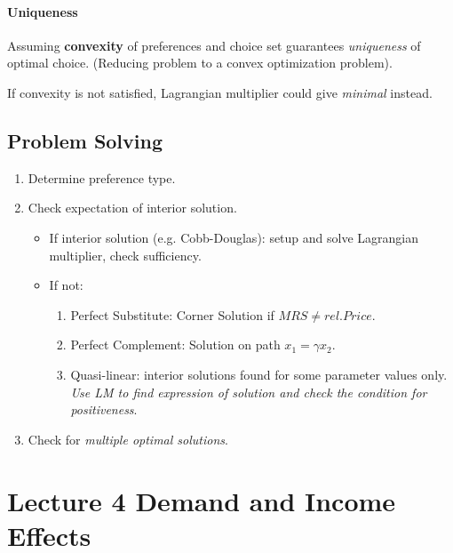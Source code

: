 \documentclass[]{article}
\begin{document}
            \paragraph{Uniqueness} Assuming \textbf{convexity} of preferences and choice set guarantees \emph{uniqueness} of optimal choice. (Reducing problem to a convex optimization problem).
            
            \begin{remark}
                If convexity is not satisfied, Lagrangian multiplier could give \emph{minimal} instead. 
            \end{remark}
        
        \subsection{Problem Solving}
            \begin{enumerate}
                \item Determine preference type.
                \item Check expectation of interior solution.
                \begin{itemize}
                    \item If interior solution (e.g. Cobb-Douglas): setup and solve Lagrangian multiplier, check sufficiency.
                    \item If not:
                    \begin{enumerate}
                        \item Perfect Substitute: Corner Solution if $MRS \neq rel.Price$.
                        \item Perfect Complement: Solution on path $x_1=\gamma x_2$.
                        \item Quasi-linear: interior solutions found for some parameter values only. \emph{Use LM to find expression of solution and check the condition for positiveness}.
                    \end{enumerate}
                \end{itemize}
                \item Check for \emph{multiple optimal solutions}.
            \end{enumerate}
            
    \section{Lecture 4 Demand and Income Effects}
\end{document}
